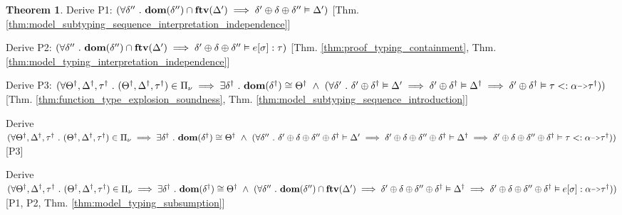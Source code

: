 \documentclass[acmsmall]{acmart}
\theoremstyle{definition}
\newtheorem{theorem}{Theorem}[section]
\begin{document}
\begin{theorem}
  \item \I\I \N Derive P1: $(
    \forall \delta'' \ .\  \textbf{dom}(\delta'') \cap \textbf{ftv}(\Delta') \implies \delta' \oplus \delta \oplus \delta'' \vDash \Delta'
  )$ [Thm. \ref{thm:model_subtyping_sequence_interpretation_independence}]

  \item \I\I \N Derive P2: $(
    \forall \delta'' \ .\  \textbf{dom}(\delta'') \cap \textbf{ftv}(\Delta') \implies \delta' \oplus \delta \oplus \delta'' \vDash e[\sigma] : \tau
  )$ [Thm. \ref{thm:proof_typing_containment},
      Thm. \ref{thm:model_typing_interpretation_independence}]

  \item \I\I \N Derive P3: $(
    \forall \Theta^\dagger, \Delta^\dagger, \tau^\dagger \qua 
    (\Theta^\dagger, \Delta^\dagger, \tau^\dagger) \in \Pi_\nu \implies
    \exists \delta^\dagger \qua \textbf{dom}(\delta^\dagger) \cong \Theta^\dagger \up 
    (
    \forall \delta' \qua
    \delta' \oplus \delta^\dagger \satisfies \Delta' \implies
    \delta' \oplus \delta^\dagger \satisfies \Delta^\dagger \implies
    \delta' \oplus \delta^\dagger \satisfies \tau \subtypes \alpha \J{->} \tau^\dagger
    )
  )$ [Thm. \ref{thm:function_type_explosion_soundness}, Thm. \ref{thm:model_subtyping_sequence_introduction}]

  \item \I\I \N Derive $(
    \forall \Theta^\dagger, \Delta^\dagger, \tau^\dagger \qua 
    (\Theta^\dagger, \Delta^\dagger, \tau^\dagger) \in \Pi_\nu \implies
    \exists \delta^\dagger \qua \textbf{dom}(\delta^\dagger) \cong \Theta^\dagger \up 
    (
    \forall \delta'' \qua
    \delta' \oplus \delta \oplus \delta'' \oplus \delta^\dagger \satisfies \Delta' \implies
    \delta' \oplus \delta \oplus \delta'' \oplus \delta^\dagger \satisfies \Delta^\dagger \implies
    \delta' \oplus \delta \oplus \delta'' \oplus \delta^\dagger \satisfies \tau \subtypes \alpha \J{->} \tau^\dagger
    )
  )$ [P3]

  \item \I\I \N Derive $(
    \forall \Theta^\dagger, \Delta^\dagger, \tau^\dagger \qua 
    (\Theta^\dagger, \Delta^\dagger, \tau^\dagger) \in \Pi_\nu \implies
    \exists \delta^\dagger \qua \textbf{dom}(\delta^\dagger) \cong \Theta^\dagger \up 
    (
    \forall \delta'' \qua
    \textbf{dom}(\delta'') \cap \textbf{ftv}(\Delta') \implies
    \delta' \oplus \delta \oplus \delta'' \oplus \delta^\dagger \satisfies \Delta^\dagger \implies
    \delta' \oplus \delta \oplus \delta'' \oplus \delta^\dagger \satisfies e[\sigma] \hastype \alpha \J{->} \tau^\dagger
    )
  )$ [P1, P2, Thm. \ref{thm:model_typing_subsumption}]


\end{theorem}
\end{document}
